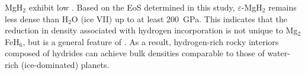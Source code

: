\documentclass[draft,jgrga,12pt]{agujournal2019}
\begin{document}

MgH$_2$  exhibit  low . 
Based on the EoS determined in this study, $\varepsilon$-MgH$_2$ remains less dense than H$_2$O (ice VII) up to at least 200~GPa. 
This indicates that the reduction in density associated with hydrogen incorporation is not unique to Mg$_2$FeH$_6$, but is  a general feature of . 
As a result, hydrogen-rich rocky interiors composed of hydrides can achieve bulk densities comparable to those of water-rich (ice-dominated) planets.
\end{document}
